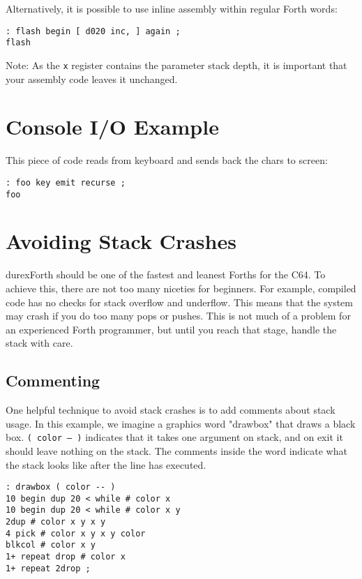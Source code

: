 Alternatively, it is possible to use inline assembly within regular Forth words:

\begin{verbatim}
: flash begin [ d020 inc, ] again ;
flash
\end{verbatim}

Note: As the \texttt{x} register contains the parameter stack depth, it is important that your assembly code leaves it unchanged.

\section{Console I/O Example}

This piece of code reads from keyboard and sends back the chars to screen:

\begin{verbatim}
: foo key emit recurse ;
foo
\end{verbatim}

\section{Avoiding Stack Crashes}

durexForth should be one of the fastest and leanest Forths for the C64. To achieve this, there are
not too many niceties for beginners. For example, compiled code has no checks for stack overflow
and underflow. This means that the system may crash if you do too many pops or pushes. This is not
much of a problem for an experienced Forth programmer, but until you reach that stage, handle the
stack with care.

\subsection{Commenting}

One helpful technique to avoid stack crashes is to add comments about stack usage.
In this example, we imagine a graphics word "drawbox" that draws a black box.
\texttt{( color -- )} indicates that it takes one argument on stack, and on exit it should
leave nothing on the stack. The comments inside the word indicate what the stack
looks like after the line has executed.

\begin{verbatim}
: drawbox ( color -- )
10 begin dup 20 < while # color x
10 begin dup 20 < while # color x y
2dup # color x y x y
4 pick # color x y x y color
blkcol # color x y
1+ repeat drop # color x
1+ repeat 2drop ;
\end{verbatim}

